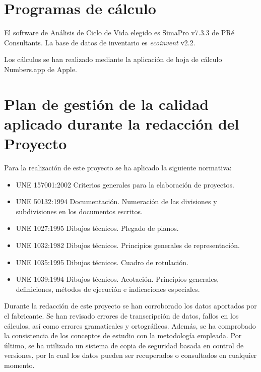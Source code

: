


\section{Programas de cálculo}

El software de Análisis de Ciclo de Vida elegido es SimaPro v7.3.3 de PRé Consultants. La base de datos de inventario es \textit{ecoinvent} v2.2.

Los cálculos se han realizado mediante la aplicación de hoja de cálculo Numbers.app de Apple.

\section{Plan de gestión de la calidad aplicado durante la redacción del Proyecto}

Para la realización de este proyecto se ha aplicado la siguiente normativa:
\begin{itemize}
  \item UNE 157001:2002 Criterios generales para la elaboración de proyectos.
  \item UNE 50132:1994 Documentación. Numeración de las divisiones y subdivisiones en los documentos escritos.
  \item UNE 1027:1995 Dibujos técnicos. Plegado de planos.
  \item UNE 1032:1982 Dibujos técnicos. Principios generales de representación.
  \item UNE 1035:1995 Dibujos técnicos. Cuadro de rotulación.
  \item UNE 1039:1994 Dibujos técnicos. Acotación. Principios generales, definiciones, métodos de ejecución e indicaciones especiales.
\end{itemize}

Durante la redacción de este proyecto se han corroborado los datos aportados por el fabricante. Se han revisado errores de transcripción de datos, fallos en los cálculos, así como errores gramaticales y ortográficos. Además, se ha comprobado la consistencia de los conceptos de estudio con la metodología empleada. Por último, se ha utilizado un sistema de copia de seguridad basada en control de versiones, por la cual los datos pueden ser recuperados o consultados en cualquier momento.

